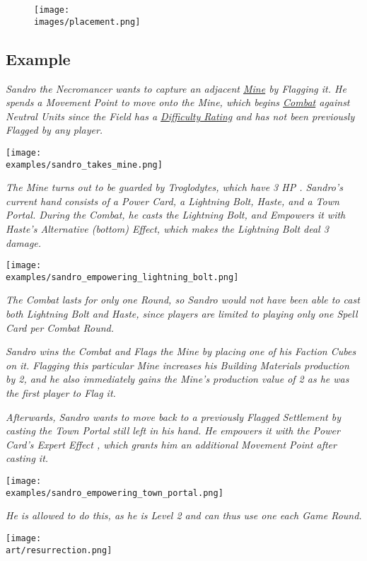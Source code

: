 \begin{figure*}[!hb]
  \centering
  \texttt{[image: \\images/placement.png]}
\end{figure*}

\clearpage

\subsection*{Example}

\begin{multicols*}{2}

\textit{Sandro the Necromancer wants to capture an adjacent \hyperlink{Mines}{Mine} by Flagging it.
He spends a Movement Point to move onto the Mine, which begins \hyperlink{Combat}{Combat} against Neutral Units since the Field has a \hyperlink{Difficulty}{Difficulty Rating} and has not been previously Flagged by any player.}\par

\texttt{[image: \\examples/sandro\_takes\_mine.png]}

\textit{The Mine turns out to be guarded by Troglodytes, which have 3 HP .
Sandro's current hand consists of a Power Card, a Lightning Bolt, Haste, and a Town Portal.
During the Combat, he casts the Lightning Bolt, and Empowers  it with Haste's Alternative (bottom) Effect, which makes the Lightning Bolt deal 3 damage.}

\texttt{[image: \\examples/sandro\_empowering\_lightning\_bolt.png]}

\textit{
The Combat lasts for only one Round, so Sandro would not have been able to cast both Lightning Bolt and Haste, since players are limited to playing only one Spell Card per Combat Round.}\par


\textit{Sandro wins the Combat and Flags the Mine by placing one of his Faction Cubes on it.
Flagging this particular Mine increases his Building Materials  production by 2, and he also immediately gains the Mine's production value of 2  as he was the first player to Flag it.}\par
\textit{Afterwards, Sandro wants to move back to a previously Flagged Settlement by casting the Town Portal still left in his hand.
He empowers it with the Power Card's Expert Effect , which grants him an additional Movement Point after casting it.
}

\texttt{[image: \\examples/sandro\_empowering\_town\_portal.png]}

\textit{He is allowed to do this, as he is Level 2 and can thus use one  each Game Round.}

\vfill
\hspace{2em}
\texttt{[image: \\art/resurrection.png]}
\end{multicols*}
